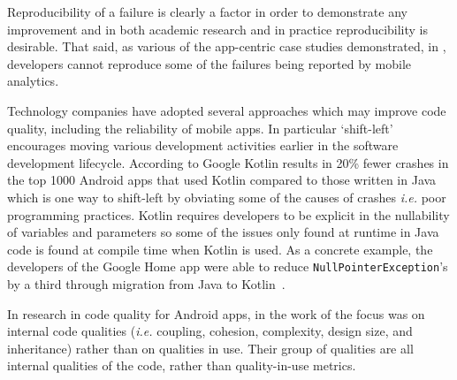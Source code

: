 Reproducibility of a failure is clearly a factor in order to demonstrate any improvement and in both academic research and in practice reproducibility is desirable. That said, as various of the app-centric case studies demonstrated, in , developers cannot reproduce some of the failures being reported by mobile analytics. %

Technology companies have adopted several approaches which may improve code quality, including the reliability of mobile apps. In particular `shift-left'~ encourages moving various development activities earlier in the software development lifecycle. According to Google Kotlin results in 20\% fewer crashes in the top 1000 Android apps that used Kotlin compared to those written in Java~ which is one way to shift-left by obviating some of the causes of crashes \emph{i.e.} poor programming practices. Kotlin requires developers to be explicit in the nullability of variables and parameters so some of the issues only found at runtime in Java code is found at compile time when Kotlin is used. As a concrete example, the developers of the Google Home app were able to reduce \texttt{NullPointerException}'s by a third through migration from Java to Kotlin~.


In research in code quality for Android apps, in the work of  the focus was on internal code qualities (\emph{i.e.} coupling, cohesion, complexity, design size, and inheritance) rather than on qualities in use. Their group of qualities are all internal qualities of the code, rather than quality-in-use metrics. 

